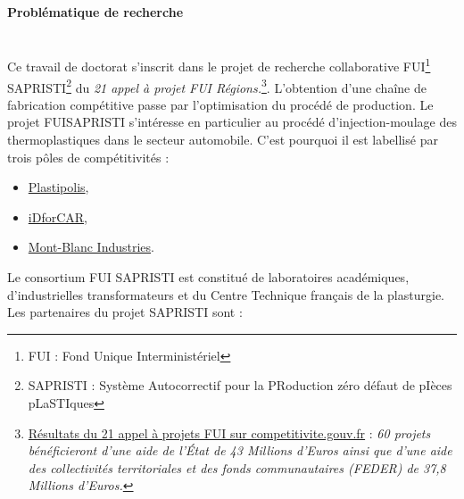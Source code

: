\bigskip
\paragraph{Problématique de recherche}\mbox{} \\
Ce travail de doctorat s'inscrit dans le projet de recherche collaborative FUI\footnote{FUI : Fond Unique Interministériel} SAPRISTI\footnote{SAPRISTI : Système Autocorrectif pour la PRoduction zéro défaut de pIèces pLaSTIques} du \textit{21 appel à projet FUI Régions.}\footnote{\href{https://competitivite.gouv.fr/les-appels-a-projets-de-r-d-fui/le-21e-appel-a-projets/les-resultats-du-21e-appel-a-projets-787.html}{Résultats du 21 appel à projets FUI sur competitivite.gouv.fr} : \textit{60 projets bénéficieront d’une aide de l’État de 43 Millions d'Euros ainsi que d’une aide des collectivités territoriales et des fonds communautaires (FEDER) de 37,8 Millions d'Euros.}}.
L’obtention d’une chaîne de fabrication compétitive passe par l’optimisation du procédé de production.
Le projet FUISAPRISTI s'intéresse en particulier au procédé d'injection-moulage des thermoplastiques dans le secteur automobile.
C'est pourquoi il est labellisé par trois pôles de compétitivités :
\begin{itemize}
	\item \href{http://www.plastipolis.fr/}{Plastipolis},
	\item \href{https://www.id4car.org}{iDforCAR},
	\item \href{https://www.montblancindustries.com/}{Mont-Blanc Industries}.
\end{itemize}
\noindent
Le consortium FUI SAPRISTI est constitué de laboratoires académiques, d'industrielles transformateurs et du Centre Technique français de la plasturgie.
Les partenaires du projet SAPRISTI sont :
